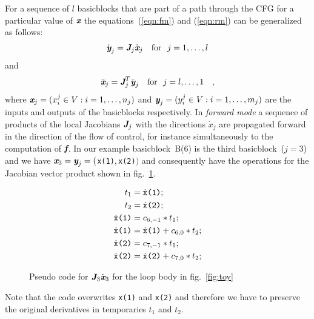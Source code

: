 \documentclass{book}
\newcommand{\basicblock}{basicblock}
\newcommand{\bmf}{\mbox{\bf\em f}}
\newcommand{\bmJ}{\mbox{\bf\em J}}
\newcommand{\bmx}{\mbox{\bf\em x}}
\newcommand{\bmy}{\mbox{\bf\em y}}
\newcommand{\reffig}[1]{{fig.~\ref{#1}}}
\begin{document}
For a sequence of $l$ {\basicblock}s that are part of 
a path through the CFG for a particular value of $\bmx$ the 
equations~(\ref{eqn:fm}) and (\ref{eqn:rm}) can be generalized as follows:
\begin{equation} \label{eqn:bbfm}
  \dot{\bmy}_j=\bmJ_j \dot{\bmx}_j \quad \text{for}~~j=1,\ldots,l
\end{equation} 
and 
\begin{equation} \label{eqn:bbrm}
  \bar{\bmx}_j=\bmJ^T_j \bar{\bmy}_j \quad \text{for}~~j=l,\ldots,1\quad ,
\end{equation} 
where $\bmx_j = (x^j_i \in V :  i=1,\ldots,n_j)$ and
$\bmy_j = (y^j_i \in V : i=1,\ldots,m_j)$ are the inputs and outputs of the 
{\basicblock}s
respectively. 
In {\em forward mode} a sequence of 
products of the local Jacobians $\bmJ_j$ 
with the directions $\dot{x}_j$ 
are propagated forward in the direction of the flow of control, for 
instance simultaneously to the computation of $\bmf$.
In our example \basicblock\ B(6) is the third \basicblock\ ($j=3$) and we have
$\bmx_3=\bmy_j=($\lstinline{x(1)}$,$\lstinline{x(2)}$)$ and 
consequently have the operations for the Jacobian vector product shown 
in \reffig{fig:toyPreacc}.  
\begin{figure}[h]
  \begin{center}
    \begin{align*}
      t_1&=\dot{\tt x}\mbox{\tt (1)} ; \\
      t_2&=\dot{\tt x}\mbox{\tt (2)}; \\
      \dot{\tt x}\mbox{\tt (1)}&=c_{6,-1}*t_1; \\
      \dot{\tt x}\mbox{\tt (1)}&=\dot{\tt x}\mbox{\tt (1)}+c_{6,0}*t_2; \\
      \dot{\tt x}\mbox{\tt (2)}&=c_{7,-1}*t_1; \\
      \dot{\tt x}\mbox{\tt (2)}&=\dot{\tt x}\mbox{\tt (2)}+c_{7,0}*t_2; 
    \end{align*}
  \end{center}	
  \caption{Pseudo code for $\bmJ_3\dot{\bmx}_3$ for the loop body in \reffig{fig:toy}}\label{fig:toyPreacc}
\end{figure}
Note that the code overwrites \lstinline{x(1)} and \lstinline{x(2)} and therefore 
we have to preserve the original derivatives in temporaries $t_1$ and $t_2$.
\end{document}
